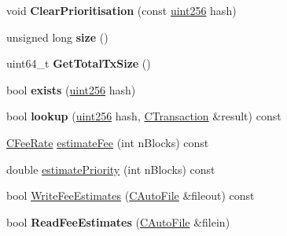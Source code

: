 \begin{DoxyCompactItemize}
\item 
\mbox{\label{class_c_tx_mem_pool_a11dea05121ab8321e1d1f1a21ec5c9ac}} 
void {\bfseries Clear\+Prioritisation} (const \mbox{\hyperlink{classuint256}{uint256}} hash)
\item 
\mbox{\label{class_c_tx_mem_pool_a867f7b452141770f3b2e8697fb3513d8}} 
unsigned long {\bfseries size} ()
\item 
\mbox{\label{class_c_tx_mem_pool_ad388f6544c2ca90f1550b06d9d86d54f}} 
uint64\+\_\+t {\bfseries Get\+Total\+Tx\+Size} ()
\item 
\mbox{\label{class_c_tx_mem_pool_adba06e79be4a1a092dd2db8290733be7}} 
bool {\bfseries exists} (\mbox{\hyperlink{classuint256}{uint256}} hash)
\item 
\mbox{\label{class_c_tx_mem_pool_ad6d9966cdeb4b6586f7186e709b4e77e}} 
bool {\bfseries lookup} (\mbox{\hyperlink{classuint256}{uint256}} hash, \mbox{\hyperlink{class_c_transaction}{C\+Transaction}} \&result) const
\item 
\mbox{\hyperlink{class_c_fee_rate}{C\+Fee\+Rate}} \mbox{\hyperlink{class_c_tx_mem_pool_a32dd66c128330aed86865c8a61857c6c}{estimate\+Fee}} (int n\+Blocks) const
\item 
double \mbox{\hyperlink{class_c_tx_mem_pool_a225378304025c093d2dc5fcb754ade3b}{estimate\+Priority}} (int n\+Blocks) const
\item 
bool \mbox{\hyperlink{class_c_tx_mem_pool_a251f595b6527be005634574ce5d01f70}{Write\+Fee\+Estimates}} (\mbox{\hyperlink{class_c_auto_file}{C\+Auto\+File}} \&fileout) const
\item 
\mbox{\label{class_c_tx_mem_pool_a0dbbcb6a3b7e1a6c564410668c12cd4f}} 
bool {\bfseries Read\+Fee\+Estimates} (\mbox{\hyperlink{class_c_auto_file}{C\+Auto\+File}} \&filein)
\end{DoxyCompactItemize}
